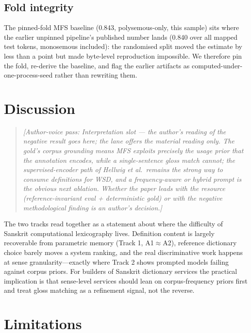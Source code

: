 \documentclass[11pt]{article}
\newcommand{\avnote}[1]{\begin{quote}\small\itshape [Author-voice pass: #1]\end{quote}}
\begin{document}
\subsection{Fold integrity}
\label{sec:fold}

The pinned-fold MFS baseline (0.843, polysemous-only, this sample) sits where the
earlier unpinned pipeline's published number lands (0.840 over all mapped test tokens,
monosemous included): the randomised split moved the estimate by less than a point but
made byte-level reproduction impossible. We therefore pin the fold, re-derive the
baseline, and flag the earlier artifacts as computed-under-one-process-seed rather than
rewriting them.

\section{Discussion}

\avnote{Interpretation slot --- the author's reading of the negative result goes here;
the lane offers the material reading only. The gold's corpus grounding means MFS
exploits precisely the usage prior that the annotation encodes, while a single-sentence
gloss match cannot; the supervised-encoder path of Hellwig et al.\ remains the
strong way to consume definitions for WSD, and a frequency-aware or hybrid
prompt is the obvious next ablation. Whether the paper leads with the resource
(reference-invariant eval + deterministic gold) or with the negative methodological
finding is an author's decision.}

The two tracks read together as a statement about where the difficulty of Sanskrit
computational lexicography lives. Definition content is largely recoverable from
parametric memory (Track 1, A1$\approx$A2), reference dictionary choice barely moves a
system ranking, and the real discriminative work happens at sense granularity---exactly
where Track 2 shows prompted models failing against corpus priors. For builders of
Sanskrit dictionary services the practical implication is that sense-level services
should lean on corpus-frequency priors first and treat gloss matching as a refinement
signal, not the reverse.

\section{Limitations}
\end{document}
